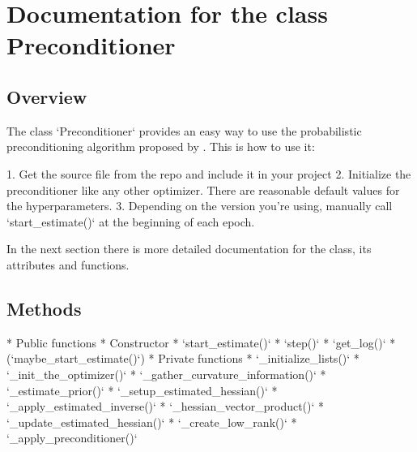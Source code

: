 \documentclass[twoside,12pt,a4paper]{report}
\begin{document}
\section{Documentation for the class Preconditioner}
\subsection{Overview}
\begin{markdown}
The class `Preconditioner` provides an easy way to use the probabilistic preconditioning algorithm proposed by \cite{roos2019active}.
This is how to use it:

1. Get the source file from the repo and include it in your project
2. Initialize the preconditioner like any other optimizer. There are reasonable default values for the hyperparameters.
3. Depending on the version you're using, manually call `start_estimate()` at the beginning of each epoch.

In the next section there is more detailed documentation for the class, its attributes and functions.
\end{markdown}

\subsection{Methods}
\begin{markdown}
* Public functions
	* Constructor
	* `start_estimate()`
	* `step()`
	* `get_log()`
	* (`maybe_start_estimate()`)
* Private functions
	* `_initialize_lists()`
	* `_init_the_optimizer()`
	* `_gather_curvature_information()`
	* `_estimate_prior()`
	* `_setup_estimated_hessian()`
	* `_apply_estimated_inverse()`
	* `_hessian_vector_product()`
	* `_update_estimated_hessian()`
	* `_create_low_rank()`
	* `_apply_preconditioner()`
	
\end{markdown}
\end{document}
